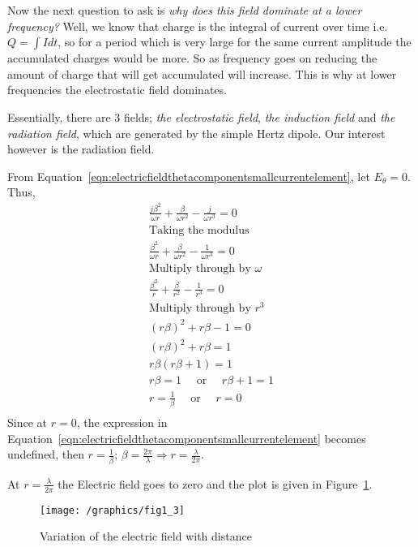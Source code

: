 Now the next question to ask is \emph{why does this field dominate at a lower frequency?} Well, we know that charge is the integral of current over time i.e. $Q =\int Idt$, so for a period which is very large for the same current amplitude the accumulated charges would be more. So as frequency goes on reducing the amount of charge that will get accumulated will increase. This is why at lower frequencies the electrostatic field dominates.

Essentially, there are 3 fields; \emph{the electrostatic field}, \emph{the induction field} and \emph{the radiation field}, which are generated by the simple Hertz dipole. Our interest however is the radiation field. 

From Equation~\eqref{eqn:electricfieldthetacomponentsmallcurrentelement}, let $E_{\theta} = 0$. Thus,
\begin{align*}
&\frac{j\beta^2}{\omega r} + \frac{\beta}{\omega r^2} - \frac{j}{\omega r^3} = 0&\\
&\text{Taking the modulus}&\\
&\frac{\beta^2}{\omega r} + \frac{\beta}{\omega r^2} - \frac{1}{\omega r^3} = 0&\\
&\text{Multiply through by $\omega$}&\\
&\frac{\beta^2}{r} + \frac{\beta}{r^2} - \frac{1}{r^3} = 0&\\
&\text{Multiply through by $r^3$}&\\
&(r\beta)^2 + r\beta - 1 = 0&\\
&(r\beta)^2 + r\beta = 1&\\
&r\beta(r\beta + 1) = 1&\\
&r\beta = 1\quad\text{ or }\quad r\beta + 1 = 1&\\
&r = \frac{1}{\beta}\quad\text{ or }\quad r = 0&\\
\end{align*}
Since at $ r = 0$, the expression in Equation~\eqref{eqn:electricfieldthetacomponentsmallcurrentelement} becomes undefined, then $ r = \frac{1}{\beta} $; $\beta = \frac{2\pi}{\lambda} \Longrightarrow r =  \frac{\lambda}{2 \pi} $.

At $ r =  \frac{\lambda}{2 \pi} $ the Electric field goes to zero and the plot is given in Figure~\ref{fig:electricfiedvariationwithdistance}.
\begin{figure}[h]
\centering
\texttt{[image: /graphics/fig1\_3]}
\caption{Variation of the electric field with distance}
\label{fig:electricfiedvariationwithdistance}
\end{figure}

